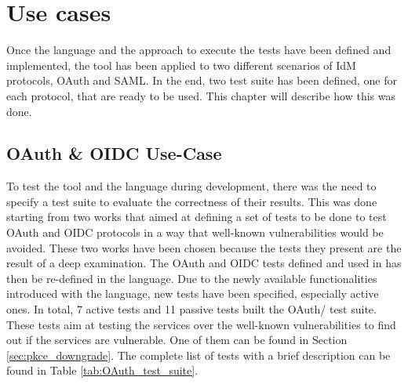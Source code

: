 \chapter{Use cases}
\label{chap:Use_cases}
Once the language and the approach to execute the tests have been defined and implemented, the tool has been applied to two different scenarios of IdM protocols, OAuth and SAML. In the end, two test suite has been defined, one for each protocol, that are ready to be used. This chapter will describe how this was done.

\section{OAuth \& OIDC Use-Case}    
To test the tool and the language during development, there was the need to specify a test suite to evaluate the correctness of their results. This was done starting from two works \cite{claudio_grisenti,wendy_barreto} that aimed at defining a set of tests to be done to test OAuth and OIDC protocols in a way that well-known vulnerabilities would be avoided. These two works have been chosen because the tests they present are the result of a deep examination. The \gls{OAuth} and \gls{OIDC} tests defined and used in \cite{claudio_grisenti,wendy_barreto} has then be re-defined in the language. Due to the newly available functionalities introduced with the language, new tests have been specified, especially active ones. In total, 7 active tests and 11 passive tests built the OAuth/ test suite. These tests aim at testing the services over the well-known vulnerabilities to find out if the services are vulnerable. One of them can be found in Section \ref{sec:pkce_downgrade}. The complete list of tests with a brief description can be found in Table \ref{tab:OAuth_test_suite}.

